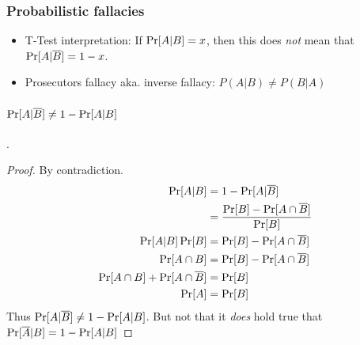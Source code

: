 \subsubsection{Probabilistic fallacies}
\begin{itemize}
    \item T-Test interpretation: If $\operatorname{Pr}[A|B] = x$, then this does \emph{not} mean that $\operatorname{Pr}[A|\overline{B}] = 1 - x$.
    \item Prosecutors fallacy aka. inverse fallacy: $P(A|B) \neq P(B|A)$
\end{itemize}

\paragraph{$\operatorname{Pr}[A|\overline{B}] \neq 1 - \operatorname{Pr}[A | B]$}. 
\begin{proof}
    By contradiction. 
    \begin{equation}
        \begin{aligned}
           \operatorname{Pr}[A|B]                 &= 1 - \operatorname{Pr}[A | \overline{B}] \\
                                           &= \frac{  \operatorname{Pr}[B] - \operatorname{Pr}[A \cap \overline{B}]  }{  \operatorname{Pr}[B]  }  \\
           \operatorname{Pr}[A|B] \operatorname{Pr}[B]   &=         \operatorname{Pr}[B] - \operatorname{Pr}[A \cap \overline{B}] \\
           \operatorname{Pr}[A \cap B]   &= \operatorname{Pr}[B] - \operatorname{Pr}[A \cap \overline{B}] \\
           \operatorname{Pr}[A \cap B] + \operatorname{Pr}[A \cap \overline{B}]  &= \operatorname{Pr}[B] \\
           \operatorname{Pr}[A] &= \operatorname{Pr}[B]
        \end{aligned}
    \end{equation}
    Thus $\operatorname{Pr}[A|\overline{B}] \neq 1 - \operatorname{Pr}[A | B]$. But not that it \emph{does} hold true that $\operatorname{Pr}[\overline{A}|B] = 1 - \operatorname{Pr}[A | B]$
\end{proof}

